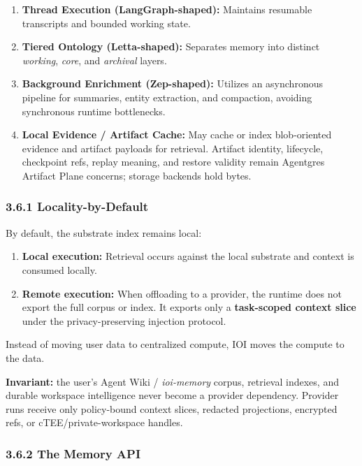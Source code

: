 \documentclass[
  11pt,
]{article}
\providecommand{\tightlist}{%
  \setlength{\itemsep}{0pt}\setlength{\parskip}{0pt}}
\begin{document}
\begin{enumerate}
\def\labelenumi{\arabic{enumi}.}
\tightlist
\item
  \textbf{Thread Execution (LangGraph-shaped):} Maintains resumable
  transcripts and bounded working state.
\item
  \textbf{Tiered Ontology (Letta-shaped):} Separates memory into
  distinct \emph{working}, \emph{core}, and \emph{archival} layers.
\item
  \textbf{Background Enrichment (Zep-shaped):} Utilizes an asynchronous
  pipeline for summaries, entity extraction, and compaction, avoiding
  synchronous runtime bottlenecks.
\item
  \textbf{Local Evidence / Artifact Cache:} May cache or index
  blob-oriented evidence and artifact payloads for retrieval. Artifact
  identity, lifecycle, checkpoint refs, replay meaning, and restore
  validity remain Agentgres Artifact Plane concerns; storage backends
  hold bytes.
\end{enumerate}

\hypertarget{locality-by-default}{%
\subsubsection{3.6.1 Locality-by-Default}\label{locality-by-default}}

By default, the substrate index remains local:

\begin{enumerate}
\def\labelenumi{\arabic{enumi}.}
\tightlist
\item
  \textbf{Local execution:} Retrieval occurs against the local substrate
  and context is consumed locally.
\item
  \textbf{Remote execution:} When offloading to a provider, the runtime
  does not export the full corpus or index. It exports only a
  \textbf{task-scoped context slice} under the privacy-preserving
  injection protocol.
\end{enumerate}

Instead of moving user data to centralized compute, IOI moves the
compute to the data.

\textbf{Invariant:} the user's Agent Wiki / \emph{ioi-memory} corpus,
retrieval indexes, and durable workspace intelligence never become a
provider dependency. Provider runs receive only policy-bound context
slices, redacted projections, encrypted refs, or cTEE/private-workspace
handles.

\hypertarget{the-memory-api}{%
\subsubsection{3.6.2 The Memory API}\label{the-memory-api}}
\end{document}
